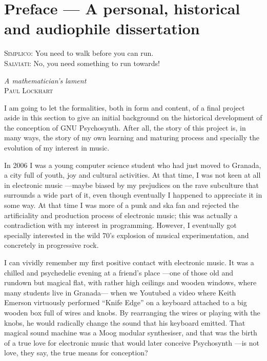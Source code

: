 
\chapter*{Preface --- A personal, historical and audiophile
  dissertation}

\epigraph{
\textsc{Simplico:} You need to walk before you can run.\\
\textsc{Salviati:} No, you need something to run towards!
}{\emph{A mathematician's lament}\\
\textsc{Paul Lockhart}}

I am going to let the formalities, both in form and content, of a
final project aside in this section to give an initial background on
the historical development of the conception of GNU Psychosynth. After
all, the story of this project is, in many ways, the story of my own
learning and maturing process and specially the evolution of my
interest in music.

In 2006 I was a young computer science student who had just moved to
Granada, a city full of youth, joy and cultural activities. At that
time, I was not keen at all in electronic music ---maybe biased by my
prejudices on the rave subculture that surrounds a wide part of it,
even though eventually I happened to appreciate it in some way. At
that time I was more of a punk and ska fan and rejected the
artificiality and production process of electronic music; this was
actually a contradiction with my interest in programming. However, I
eventually got specially interested in the wild 70's explosion of
musical experimentation, and concretely in progressive rock.

I can vividly remember my first positive contact with electronic
music. It was a chilled and psychedelic evening at a friend's place
---one of those old and rundown but magical flat, with rather high
ceilings and wooden windows, where many students live in Granada---
when we Youtubed a video where Keith Emerson virtuously performed
``Knife Edge'' on a keyboard attached to a big wooden box full of
wires and knobs. By rearranging the wires or playing with the knobs,
he would radically change the sound that his keyboard
emitted. That magical sound machine was a Moog modular synthesiser,
and that was the birth of a true love for electronic music that would
later conceive Psychosynth ---is not love, they say, the true means
for conception?

